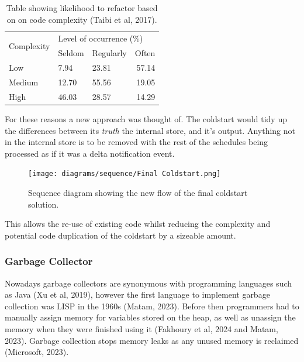 \begin{table}[H]
  \centering
  \begin{tabular}{|l|llr|}
  \hline
  \multicolumn{1}{|c|}{\multirow{2}{*}{Complexity}} & \multicolumn{3}{l|}{Level of occurrence (\%)}                        \\ \cline{2-4} 
  \multicolumn{1}{|c|}{}                            & \multicolumn{1}{l|}{Seldom} & \multicolumn{1}{l|}{Regularly} & Often \\ \hline
  Low                                               & \multicolumn{1}{l|}{7.94}   & \multicolumn{1}{l|}{23.81}     & 57.14 \\ \hline
  Medium                                            & \multicolumn{1}{l|}{12.70}  & \multicolumn{1}{l|}{55.56}     & 19.05 \\ \hline
  High                                              & \multicolumn{1}{l|}{46.03}  & \multicolumn{1}{l|}{28.57}     & 14.29 \\ \hline
  \end{tabular}
  \caption{Table showing likelihood to refactor based on on code complexity (Taibi et al, 2017).}
  \end{table}

  \newpage
  For these reasons a new approach was thought of. The coldstart would tidy up the differences between its \textit{truth} the internal store, and 
  it's output. Anything not in the internal store is to be removed with the rest of the schedules being processed as if it was a delta notification 
  event.

  \begin{figure}[H]
    \centering
    \texttt{[image: diagrams/sequence/Final Coldstart.png]}
    \caption{Sequence diagram showing the new flow of the final coldstart solution.}
    \label{fig:finalColdstart}
  \end{figure}

  This allows the re-use of existing code whilst reducing the complexity and potential code duplication of the coldstart by a sizeable amount.

  \newpage
  \subsubsection{Garbage Collector}
  Nowadays garbage collectors are synonymous with programming languages such as Java (Xu et al, 2019), however the first language to implement garbage 
  collection was LISP in the 1960s (Matam, 2023). Before then programmers had to manually assign memory for variables stored on the heap, as well as 
  unassign the memory when they were finished using it (Fakhoury et al, 2024 and Matam, 2023). 
  Garbage collection stops memory leaks as any unused memory is reclaimed (Microsoft, 2023).

